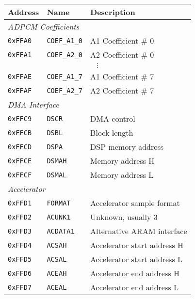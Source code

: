 \documentclass[oneside,english,a4paper,10pt,oneside,openany,final]{memoir}
\newcommand{\Address}[1]{\texttt{#1}}
\newcommand{\Register}[1]{\texttt{#1}}
\begin{document}
\begin{table}[htb]
\centering
\begin{tabular}{|l|l|l|}
\hline
\textbf{Address} & \textbf{Name}      & \textbf{Description}          \\ \hline
\multicolumn{3}{|l|}{\textit{ADPCM Coefficients}}                     \\ \hline
\Address{0xFFA0} & \Register{COEF\_A1\_0} & A1 Coefficient \# 0 \\ \hline
\Address{0xFFA1} & \Register{COEF\_A2\_0} & A2 Coefficient \# 0 \\ \hline
\multicolumn{3}{|c|}{$\vdots$}                                  \\ \hline
\Address{0xFFAE} & \Register{COEF\_A1\_7} & A1 Coefficient \# 7 \\ \hline
\Address{0xFFAF} & \Register{COEF\_A2\_7} & A2 Coefficient \# 7 \\ \hline
\multicolumn{3}{|l|}{\textit{DMA Interface}}                          \\ \hline
\Address{0xFFC9} & \Register{DSCR}    & DMA control                   \\ \hline
\Address{0xFFCB} & \Register{DSBL}    & Block length                  \\ \hline
\Address{0xFFCD} & \Register{DSPA}    & DSP memory address            \\ \hline
\Address{0xFFCE} & \Register{DSMAH}   & Memory address H              \\ \hline
\Address{0xFFCF} & \Register{DSMAL}   & Memory address L              \\ \hline
\multicolumn{3}{|l|}{\textit{Accelerator}}                            \\ \hline
\Address{0xFFD1} & \Register{FORMAT}  & Accelerator sample format     \\ \hline
\Address{0xFFD2} & \Register{ACUNK1}  & Unknown, usually 3            \\ \hline
\Address{0xFFD3} & \Register{ACDATA1} & Alternative ARAM interface    \\ \hline
\Address{0xFFD4} & \Register{ACSAH}   & Accelerator start address H   \\ \hline
\Address{0xFFD5} & \Register{ACSAL}   & Accelerator start address L   \\ \hline
\Address{0xFFD6} & \Register{ACEAH}   & Accelerator end address H     \\ \hline
\Address{0xFFD7} & \Register{ACEAL}   & Accelerator end address L     \\ \hline

\end{tabular}
\end{table}
\end{document}
